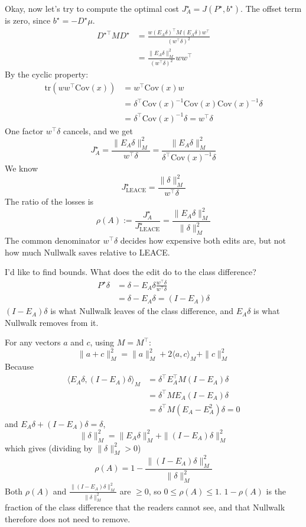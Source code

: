 \documentclass[10pt,a4paper,twocolumn]{article}
\begin{document}
	Okay, now let's try to compute the optimal cost $J^\star_A = J(P^\star, b^\star)$. The offset term is zero, since $b^\star = - D^\star \mu$.
	$$\begin{aligned}
		D^{\star \top} M D^\star & = \frac{w (E_A \delta)^\top M (E_A \delta) w^\top}{(w^\top \delta)^2} \\
		& = \frac{\| E_A \delta \|_M^2}{(w^\top \delta)^2} w w^\top
	\end{aligned}$$
	By the cyclic property:
	$$\begin{aligned}
		\mathrm{tr} \left( w w^\top \mathrm{Cov}(x) \right) & = w^\top \mathrm{Cov}(x) w \\
		& = \delta^\top \mathrm{Cov}(x)^{-1} \mathrm{Cov}(x) \mathrm{Cov}(x)^{-1} \delta \\
		& = \delta^\top \mathrm{Cov}(x)^{-1} \delta = w^\top \delta
	\end{aligned}$$
	One factor $w^\top \delta$ cancels, and we get
	$$J^\star_A = \frac{\| E_A \delta \|_M^2}{w^\top \delta} = \frac{\| E_A \delta \|_M^2}{\delta^\top \mathrm{Cov}(x)^{-1} \delta}$$
	We know
	$$J^\star_{\mathrm{LEACE}} = \frac{\| \delta \|_M^2}{w^\top \delta}$$
	The ratio of the losses is
	$$\rho(A) := \frac{J^\star_A}{J^\star_{\mathrm{LEACE}}} = \frac{\| E_A \delta \|_M^2}{\| \delta \|_M^2}$$
	The common denominator $w^\top \delta$ decides how expensive both edits are, but not how much Nullwalk saves relative to LEACE.

	I'd like to find bounds. What does the edit do to the class difference?
	$$\begin{aligned}
		P^\star \delta & = \delta - E_A \delta \frac{w^\top \delta}{w^\top \delta} \\
		& = \delta - E_A \delta = (I - E_A) \delta
	\end{aligned}$$
	$(I - E_A) \delta$ is what Nullwalk leaves of the class difference, and $E_A \delta$ is what Nullwalk removes from it.

	For any vectors $a$ and $c$, using $M = M^\top$:
	$$\| a + c \|_M^2 = \| a \|_M^2 + 2 \langle a, c \rangle_M + \| c \|_M^2$$
	Because
	$$\begin{aligned}
		\langle E_A \delta, (I - E_A) \delta \rangle_M & = \delta^\top E_A^\top M (I - E_A) \delta \\
		& = \delta^\top M E_A (I - E_A) \delta \\
		& = \delta^\top M (E_A - E_A^2) \delta = 0
	\end{aligned}$$
	and $E_A \delta + (I - E_A) \delta = \delta$,
	$$\| \delta \|_M^2 = \| E_A \delta \|_M^2 + \| (I - E_A) \delta \|_M^2$$
	which gives (dividing by $\| \delta \|_M^2 > 0$)
	$$\rho(A) = 1 - \frac{\| (I - E_A) \delta \|_M^2}{\| \delta \|_M^2}$$
	Both $\rho(A)$ and $\frac{\| (I - E_A) \delta \|_M^2}{\| \delta \|_M^2}$ are $\ge 0$, so $0 \le \rho(A) \le 1$. $1 - \rho(A)$ is the fraction of the class difference that the readers cannot see, and that Nullwalk therefore does not need to remove.
\end{document}
